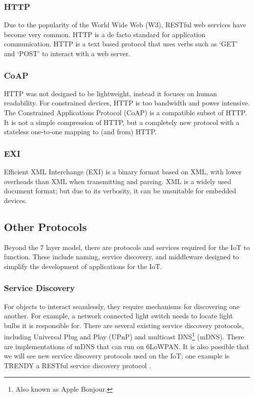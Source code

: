 \documentclass[10pt,journal,compsoc]{IEEEtran}
\begin{document}
\subsubsection{HTTP} Due to the popularity of the World Wide Web (W3), RESTful
web services have become very common. HTTP is a de facto standard for
application communication. HTTP is a text based protocol that uses verbs such
as `GET' and `POST' to interact with a web server.  

\subsubsection{CoAP}
HTTP was not designed to be lightweight, instead it focuses on human
readability. For constrained devices, HTTP is too bandwidth and power
intensive. The Constrained Applications Protocol (CoAP) is a compatible subset
of HTTP. It is not a simple compression of HTTP, but a completely new protocol
with a stateless one-to-one mapping to (and from) HTTP. 

\subsubsection{EXI}
Efficient XML Interchange (EXI) is a binary format based on XML, with lower
overheads than XML when transmitting and parsing. XML is a widely used document
format; but due to its verbosity, it can be unsuitable for embedded devices. 

\subsection{Other Protocols} 
Beyond the 7 layer model, there are protocols and services required for the IoT
to function. These include naming, service discovery, and middleware designed
to simplify the development of applications for the IoT.

\subsubsection{Service Discovery}
For objects to interact seamlessly, they require mechanisms for discovering one
another. For example, a network connected light switch needs to locate light
bulbs it is responsible for. There are several existing service discovery
protocols, including Universal Plug and Play (UPnP) and multicast
DNS\footnote{Also known as Apple Bonjour.} (mDNS). There are implementations of
mDNS that can run on 6LoWPAN. It is also possible that we will see new service
discovery protocols used on the IoT; one example is TRENDY a RESTful service
discovery protocol \cite{Butt2013}. 
\end{document}
